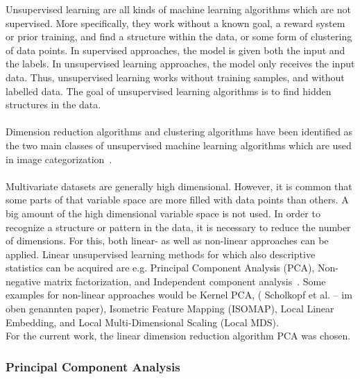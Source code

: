 Unsupervised learning are all kinds of machine learning algorithms which are not supervised. More specifically, they work without a known goal, a reward system or prior training, and find a structure within the data, or some form of clustering of data points. In supervised approaches, the model is given both the input and the labels. In unsupervised learning approaches, the model only receives the input data. Thus, unsupervised learning works without training samples, and without labelled data. The goal of unsupervised learning algorithms is to find hidden structures in the data.  \\
\\
Dimension reduction algorithms and clustering algorithms have been identified as the two main classes of unsupervised machine learning algorithms which are used in image categorization~\citep{olaode2014}. \\
\\
Multivariate datasets are generally high dimensional. However, it is common that some parts of that variable space are more filled with data points than others. A big amount of the high dimensional variable space is not used. In order to recognize a structure or pattern in the data, it is necessary to reduce the number of dimensions. For this, both linear- as well as non-linear approaches can be applied. Linear unsupervised learning methods for which also descriptive statistics can be acquired are e.g. Principal Component Analysis (PCA), Non-negative matrix factorization, and Independent component analysis~\citep{olaode2014}. Some examples for non-linear approaches would be Kernel PCA,  ( Scholkopf  et  al. – im oben genannten paper),  Isometric  Feature  Mapping  (ISOMAP),  Local  Linear  Embedding,  and Local  Multi-Dimensional  Scaling  (Local  MDS). \\
For the current work, the linear dimension reduction algorithm PCA was chosen.


\subsubsection{Principal Component Analysis}


